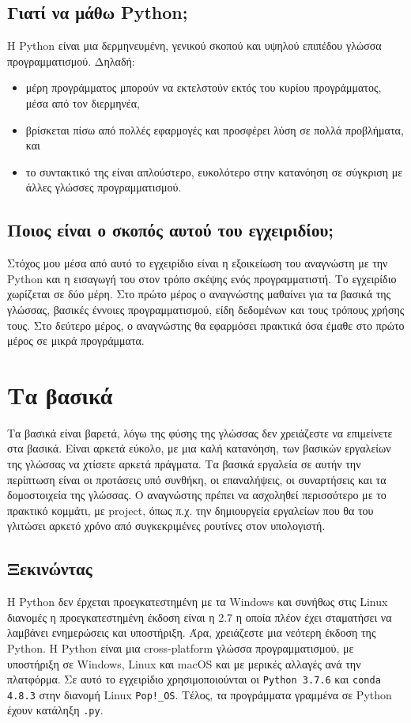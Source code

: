 \documentclass[a4paper,14pt]{extreport}
\begin{document}
\section{Γιατί να μάθω Python;}

Η Python είναι μια δερμηνευμένη, γενικού σκοπού και υψηλού επιπέδου γλώσσα
προγραμματισμού. Δηλαδή:
\begin{itemize}
    \item μέρη προγράμματος μπορούν να εκτελστούν εκτός του κυρίου
          προγράμματος, μέσα από τον διερμηνέα,
    \item βρίσκεται πίσω από πολλές εφαρμογές και προσφέρει λύση σε πολλά
          προβλήματα, και
    \item το συντακτικό της είναι απλούστερο, ευκολότερο στην κατανόηση σε
          σύγκριση με άλλες γλώσσες προγραμματισμού.
\end{itemize}

\section{Ποιος είναι ο σκοπός αυτού του εγχειριδίου;}

Στόχος μου μέσα από αυτό το εγχειρίδιο είναι η εξοικείωση του αναγνώστη
με την Python και η εισαγωγή του στον τρόπο σκέψης ενός προγραμματιστή.
Το εγχειρίδιο χωρίζεται σε δύο μέρη. Στο πρώτο μέρος ο αναγνώστης μαθαίνει
για τα βασικά της γλώσσας, βασικές έννοιες προγραμματισμού, είδη δεδομένων
και τους τρόπους χρήσης τους. Στο δεύτερο μέρος, ο αναγνώστης θα εφαρμόσει
πρακτικά όσα έμαθε στο πρώτο μέρος σε μικρά προγράμματα.

\chapter{Τα βασικά}
Τα βασικά είναι βαρετά, λόγω της φύσης της γλώσσας δεν χρειάζεστε να επιμείνετε στα βασικά. Είναι αρκετά εύκολο, με μια καλή κατανόηση, των βασικών εργαλείων της γλώσσας να χτίσετε αρκετά πράγματα. Τα βασικά εργαλεία σε αυτήν την περίπτωση είναι οι προτάσεις υπό συνθήκη, οι επαναλήψεις, οι συναρτήσεις και τα δομοστοιχεία της γλώσσας. Ο αναγνώστης πρέπει να ασχοληθεί περισσότερο με το πρακτικό κομμάτι, με project, όπως π.χ. την δημιουργεία εργαλείων που θα του γλιτώσει αρκετό χρόνο από συγκεκριμένες ρουτίνες στον υπολογιστή.
\newpage

\section{Ξεκινώντας}
Η Python δεν έρχεται προεγκατεστημένη με τα Windows και συνήθως στις Linux διανομές η προεγκατεστημένη έκδοση είναι η 2.7 η οποία πλέον έχει σταματήσει να λαμβάνει ενημερώσεις και υποστήριξη. Άρα, χρειάζεστε μια νεότερη έκδοση της  Python. Η Python είναι μια cross-platform γλώσσα προγραμματισμού, με υποστήριξη σε Windows, Linux και macOS και με μερικές αλλαγές ανά την πλατφόρμα. Σε αυτό το εγχειρίδιο χρησιμοποιούνται οι \lstinline{Python 3.7.6} και \lstinline{conda 4.8.3} στην διανομή Linux \lstinline{Pop!_OS}. Τέλος, τα προγράμματα γραμμένα σε Python έχουν κατάληξη \lstinline{.py}.
\end{document}
